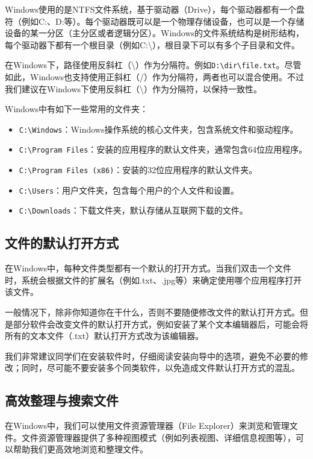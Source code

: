 \documentclass[../main.tex]{subfiles}
\begin{document}
Windows使用的是NTFS文件系统，基于驱动器（Drive），每个驱动器都有一个盘符（例如C:、D:等）。每个驱动器既可以是一个物理存储设备，也可以是一个存储设备的某一分区（主分区或者逻辑分区）。Windows的文件系统结构是树形结构，每个驱动器下都有一个根目录（例如C:\textbackslash），根目录下可以有多个子目录和文件。

在Windows下，路径使用反斜杠（\textbackslash）作为分隔符。例如\texttt{D:\textbackslash dir\textbackslash file.txt}。尽管如此，Windows也支持使用正斜杠（/）作为分隔符，两者也可以混合使用。不过我们建议在Windows下使用反斜杠（\textbackslash）作为分隔符，以保持一致性。

Windows中有如下一些常用的文件夹：
\begin{itemize}
  \item \texttt{C:\textbackslash Windows}：Windows操作系统的核心文件夹，包含系统文件和驱动程序。
  \item \texttt{C:\textbackslash Program Files}：安装的应用程序的默认文件夹，通常包含64位应用程序。
  \item \texttt{C:\textbackslash Program Files (x86)}：安装的32位应用程序的默认文件夹。
  \item \texttt{C:\textbackslash Users}：用户文件夹，包含每个用户的个人文件和设置。
  \item \texttt{C:\textbackslash Downloads}：下载文件夹，默认存储从互联网下载的文件。
\end{itemize}

\subsection{文件的默认打开方式}

在Windows中，每种文件类型都有一个默认的打开方式。当我们双击一个文件时，系统会根据文件的扩展名（例如.txt、.jpg等）来确定使用哪个应用程序打开该文件。

一般情况下，除非你知道你在干什么，否则不要随便修改文件的默认打开方式。但是部分软件会改变文件的默认打开方式，例如安装了某个文本编辑器后，可能会将所有的文本文件（.txt）默认打开方式改为该编辑器。

我们非常建议同学们在安装软件时，仔细阅读安装向导中的选项，避免不必要的修改；同时，尽可能不要安装多个同类软件，以免造成文件默认打开方式的混乱。

\subsection{高效整理与搜索文件}

在Windows中，我们可以使用文件资源管理器（File Explorer）来浏览和管理文件。文件资源管理器提供了多种视图模式（例如列表视图、详细信息视图等），可以帮助我们更高效地浏览和整理文件。
\end{document}
